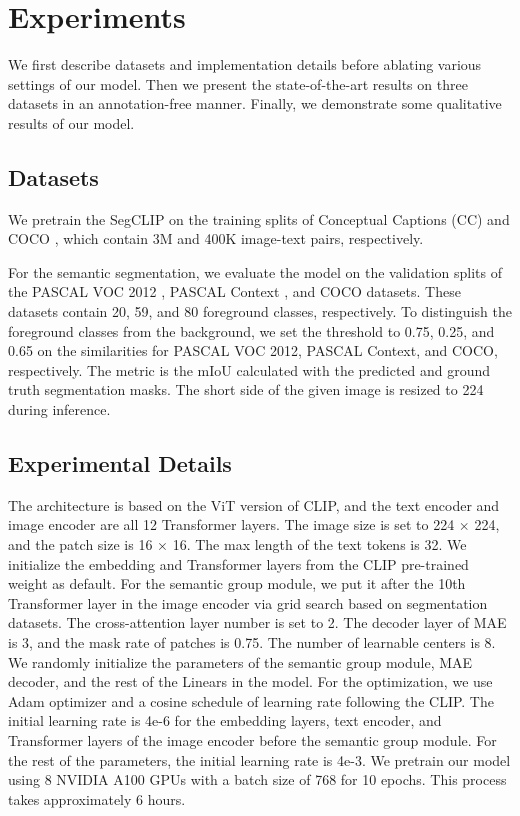 \documentclass{article}
\theoremstyle{plain}
\theoremstyle{definition}
\theoremstyle{remark}
\begin{document}
\section{Experiments}
\label{sec_experiments}
We first describe datasets and implementation details before ablating various settings of our model. Then we present the state-of-the-art results on three datasets in an annotation-free manner. Finally, we demonstrate some qualitative results of our model.

\subsection{Datasets}
We pretrain the SegCLIP on the training splits of Conceptual Captions (CC) \cite{Sharma2018CC} and COCO \cite{Lin2014COCO}, which contain 3M and 400K image-text pairs, respectively. 

For the semantic segmentation, we evaluate the model on the validation splits of the PASCAL VOC 2012 \cite{Everingham2010VOC}, PASCAL Context \cite{Mottaghi2014Context}, and COCO datasets. These datasets contain  20, 59, and 80 foreground classes, respectively. To distinguish the foreground classes from the background, we set the threshold to 0.75, 0.25, and 0.65 on the similarities for PASCAL VOC 2012, PASCAL Context, and COCO, respectively. The metric is the mIoU calculated with the predicted and ground truth segmentation masks. The short side of the given image is resized to 224 during inference.

\subsection{Experimental Details}
The architecture is based on the ViT version of CLIP, and the text encoder and image encoder are all 12 Transformer layers. The image size is set to 224 $\times$ 224, and the patch size is 16 $\times$ 16. The max length of the text tokens is 32. We initialize the embedding and Transformer layers from the CLIP pre-trained weight as default. For the semantic group module, we put it after the 10th Transformer layer in the image encoder via grid search based on segmentation datasets. The cross-attention layer number is set to 2. The decoder layer of MAE is 3, and the mask rate of patches is 0.75. The number of learnable centers is 8. We randomly initialize the parameters of the semantic group module, MAE decoder, and the rest of the Linears in the model. For the optimization, we use Adam optimizer and a cosine schedule of learning rate following the CLIP. The initial learning rate is 4e-6 for the embedding layers, text encoder, and Transformer layers of the image encoder before the semantic group module. For the rest of the parameters, the initial learning rate is 4e-3. We pretrain our model using 8 NVIDIA A100 GPUs with a batch size of 768 for 10 epochs. This process takes approximately 6 hours.
\end{document}
